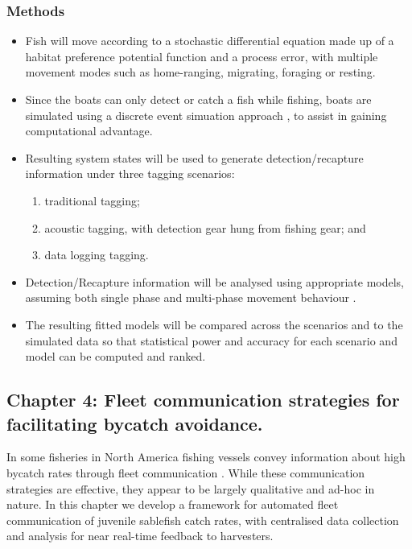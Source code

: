 \documentclass[11pt]{article}
\begin{document}
\subsubsection*{Methods}
\begin{itemize}
  \item Fish will move according to a stochastic differential equation \citep{brillinger2001use,brillinger2003simulating} made up of a habitat preference potential function and a process error, with multiple movement modes such as home-ranging, migrating, foraging or resting.
  \item Since the boats can only detect or catch a fish while fishing, boats are simulated using a discrete event simuation approach \citep{perestrello1993discrete}, to assist in gaining computational advantage.
  \item Resulting system states will be used to generate detection/recapture information under three tagging scenarios:
    \begin{enumerate}
      \item traditional tagging;
      \item acoustic tagging, with detection gear hung from fishing gear; and
      \item data logging tagging.
    \end{enumerate}
  \item Detection/Recapture information will be analysed using appropriate models, assuming both single phase and multi-phase movement behaviour \citep{fryxell2008multiple,righton2008reconstructing}. 
  \item The resulting fitted models will be compared across the scenarios and to the simulated data so that statistical power and accuracy for each scenario and model can be computed and ranked.
\end{itemize}


\subsection*{Chapter 4: Fleet communication strategies for facilitating bycatch avoidance.}
In some fisheries in North America fishing vessels convey information about high bycatch rates through fleet communication \citep{gilman2006fleet}. While these communication strategies are effective, they appear to be largely qualitative and ad-hoc in nature. In this chapter we develop a framework for automated fleet communication of juvenile sablefish catch rates, with centralised data collection and analysis for near real-time feedback to harvesters. 
\end{document}
